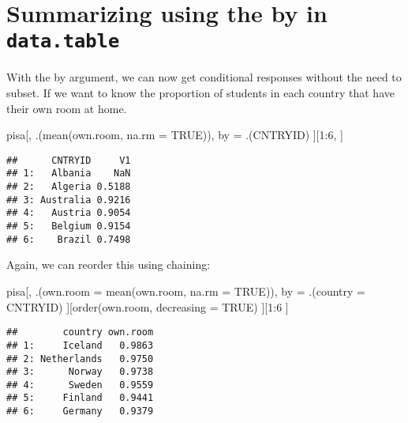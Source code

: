 \documentclass[
]{book}
\newenvironment{Shaded}{\begin{snugshade}}{\end{snugshade}}
\newcommand{\AttributeTok}[1]{\textcolor[rgb]{0.77,0.63,0.00}{#1}}
\newcommand{\ConstantTok}[1]{\textcolor[rgb]{0.00,0.00,0.00}{#1}}
\newcommand{\DecValTok}[1]{\textcolor[rgb]{0.00,0.00,0.81}{#1}}
\newcommand{\FunctionTok}[1]{\textcolor[rgb]{0.00,0.00,0.00}{#1}}
\newcommand{\NormalTok}[1]{#1}
\newcommand{\OtherTok}[1]{\textcolor[rgb]{0.56,0.35,0.01}{#1}}
\newcommand{\SpecialCharTok}[1]{\textcolor[rgb]{0.00,0.00,0.00}{#1}}
\begin{document}
\hypertarget{summarizing-using-the-by-in-data.table}{%
\section{\texorpdfstring{Summarizing using the by in \texttt{data.table}}{Summarizing using the by in data.table}}\label{summarizing-using-the-by-in-data.table}}

With the by argument, we can now get conditional responses without the need to subset. If we want to know the proportion of students in each country that have their own room at home.

\begin{Shaded}
\begin{Highlighting}[]
\NormalTok{pisa[,}
\NormalTok{     .(}\FunctionTok{mean}\NormalTok{(own.room, }\AttributeTok{na.rm =} \ConstantTok{TRUE}\NormalTok{)),}
\NormalTok{     by }\OtherTok{=}\NormalTok{ .(CNTRYID)}
\NormalTok{     ][}\DecValTok{1}\SpecialCharTok{:}\DecValTok{6}\NormalTok{,}
\NormalTok{     ]}
\end{Highlighting}
\end{Shaded}

\begin{verbatim}
##      CNTRYID     V1
## 1:   Albania    NaN
## 2:   Algeria 0.5188
## 3: Australia 0.9216
## 4:   Austria 0.9054
## 5:   Belgium 0.9154
## 6:    Brazil 0.7498
\end{verbatim}

Again, we can reorder this using chaining:

\begin{Shaded}
\begin{Highlighting}[]
\NormalTok{pisa[,}
\NormalTok{     .(}\AttributeTok{own.room =} \FunctionTok{mean}\NormalTok{(own.room, }\AttributeTok{na.rm =} \ConstantTok{TRUE}\NormalTok{)),}
\NormalTok{     by }\OtherTok{=}\NormalTok{ .(}\AttributeTok{country =}\NormalTok{ CNTRYID)}
\NormalTok{     ][}\FunctionTok{order}\NormalTok{(own.room, }\AttributeTok{decreasing =} \ConstantTok{TRUE}\NormalTok{)}
\NormalTok{       ][}\DecValTok{1}\SpecialCharTok{:}\DecValTok{6}
\NormalTok{         ]}
\end{Highlighting}
\end{Shaded}

\begin{verbatim}
##        country own.room
## 1:     Iceland   0.9863
## 2: Netherlands   0.9750
## 3:      Norway   0.9738
## 4:      Sweden   0.9559
## 5:     Finland   0.9441
## 6:     Germany   0.9379
\end{verbatim}
\end{document}
